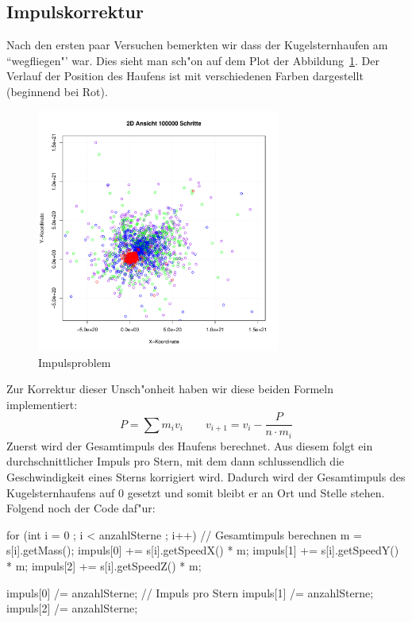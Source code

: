 \begin{refsection}
\subsection{Impulskorrektur}
Nach den ersten paar Versuchen bemerkten wir dass der Kugelsternhaufen
am ``wegfliegen"' war. Dies sieht man sch"on auf dem Plot der
Abbildung~\ref{Kugel.Impulsproblem}. Der Verlauf der Position des Haufens
ist mit verschiedenen Farben dargestellt (beginnend bei Rot).
\begin{figure}[h]
	\begin{center}
		\includegraphics[width = 8cm]{kugel/images/verschiebung.pdf}
	\end{center}
	\caption{Impulsproblem
	\label{Kugel.Impulsproblem}}
\end{figure}

Zur Korrektur dieser Unsch"onheit haben wir diese beiden Formeln implementiert:
\begin{equation}
	 P = \sum m_i  v_i \qquad  v_{i+1} =  v_i - \dfrac{ P}{n \cdot m_i}
	\label{kugel:Formel:Korrektur}
\end{equation}
Zuerst wird der Gesamtimpuls des Haufens berechnet. Aus diesem folgt
ein durchschnittlicher Impuls pro Stern, mit dem dann schlussendlich
die Geschwindigkeit eines Sterns korrigiert wird. Dadurch wird der
Gesamtimpuls des Kugelsternhaufens auf 0 gesetzt und somit bleibt er an
Ort und Stelle stehen. Folgend noch der Code daf"ur:
\begin{Cpp}
for (int i = 0 ; i < anzahlSterne ; i++){	// Gesamtimpuls berechnen
	m = s[i].getMass();
	impuls[0] += s[i].getSpeedX() * m;
	impuls[1] += s[i].getSpeedY() * m;
	impuls[2] += s[i].getSpeedZ() * m;
}
  
impuls[0] /= anzahlSterne;					// Impuls pro Stern
impuls[1] /= anzahlSterne;
impuls[2] /= anzahlSterne;


\end{Cpp}
\end{refsection}
